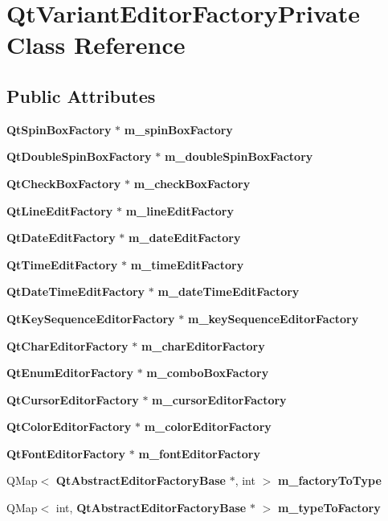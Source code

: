 \section{Qt\+Variant\+Editor\+Factory\+Private Class Reference}
\label{classQtVariantEditorFactoryPrivate}
\subsection*{Public Attributes}
\begin{DoxyCompactItemize}
\item 
{\bf Qt\+Spin\+Box\+Factory} $\ast$ {\bf m\+\_\+spin\+Box\+Factory}
\item 
{\bf Qt\+Double\+Spin\+Box\+Factory} $\ast$ {\bf m\+\_\+double\+Spin\+Box\+Factory}
\item 
{\bf Qt\+Check\+Box\+Factory} $\ast$ {\bf m\+\_\+check\+Box\+Factory}
\item 
{\bf Qt\+Line\+Edit\+Factory} $\ast$ {\bf m\+\_\+line\+Edit\+Factory}
\item 
{\bf Qt\+Date\+Edit\+Factory} $\ast$ {\bf m\+\_\+date\+Edit\+Factory}
\item 
{\bf Qt\+Time\+Edit\+Factory} $\ast$ {\bf m\+\_\+time\+Edit\+Factory}
\item 
{\bf Qt\+Date\+Time\+Edit\+Factory} $\ast$ {\bf m\+\_\+date\+Time\+Edit\+Factory}
\item 
{\bf Qt\+Key\+Sequence\+Editor\+Factory} $\ast$ {\bf m\+\_\+key\+Sequence\+Editor\+Factory}
\item 
{\bf Qt\+Char\+Editor\+Factory} $\ast$ {\bf m\+\_\+char\+Editor\+Factory}
\item 
{\bf Qt\+Enum\+Editor\+Factory} $\ast$ {\bf m\+\_\+combo\+Box\+Factory}
\item 
{\bf Qt\+Cursor\+Editor\+Factory} $\ast$ {\bf m\+\_\+cursor\+Editor\+Factory}
\item 
{\bf Qt\+Color\+Editor\+Factory} $\ast$ {\bf m\+\_\+color\+Editor\+Factory}
\item 
{\bf Qt\+Font\+Editor\+Factory} $\ast$ {\bf m\+\_\+font\+Editor\+Factory}
\item 
Q\+Map$<$ {\bf Qt\+Abstract\+Editor\+Factory\+Base} $\ast$, int $>$ {\bf m\+\_\+factory\+To\+Type}
\item 
Q\+Map$<$ int, {\bf Qt\+Abstract\+Editor\+Factory\+Base} $\ast$ $>$ {\bf m\+\_\+type\+To\+Factory}
\end{DoxyCompactItemize}


